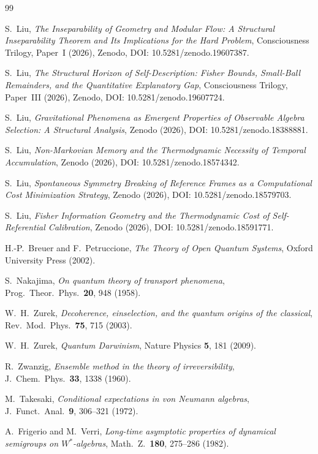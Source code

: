 \documentclass[12pt]{article}
\theoremstyle{definition}
\theoremstyle{remark}
\begin{document}
\begin{thebibliography}{99}

S.~Liu,
\emph{The Inseparability of Geometry and Modular Flow: A Structural Inseparability Theorem and Its Implications for the Hard Problem},
Consciousness Trilogy, Paper~I (2026),
Zenodo, DOI: 10.5281/zenodo.19607387.

S.~Liu,
\emph{The Structural Horizon of Self-Description: Fisher Bounds, Small-Ball Remainders, and the Quantitative Explanatory Gap},
Consciousness Trilogy, Paper~III (2026),
Zenodo, DOI: 10.5281/zenodo.19607724.

S.~Liu,
\emph{Gravitational Phenomena as Emergent Properties of Observable Algebra Selection: A Structural Analysis},
Zenodo (2026), DOI: 10.5281/zenodo.18388881.

S.~Liu,
\emph{Non-Markovian Memory and the Thermodynamic Necessity of Temporal Accumulation},
Zenodo (2026), DOI: 10.5281/zenodo.18574342.

S.~Liu,
\emph{Spontaneous Symmetry Breaking of Reference Frames as a Computational Cost Minimization Strategy},
Zenodo (2026), DOI: 10.5281/zenodo.18579703.

S.~Liu,
\emph{Fisher Information Geometry and the Thermodynamic Cost of Self-Referential Calibration},
Zenodo (2026), DOI: 10.5281/zenodo.18591771.

H.-P.~Breuer and F.~Petruccione,
\emph{The Theory of Open Quantum Systems},
Oxford University Press (2002).

S.~Nakajima,
\emph{On quantum theory of transport phenomena},
Prog.\ Theor.\ Phys.\ \textbf{20}, 948 (1958).

W.~H.~Zurek,
\emph{Decoherence, einselection, and the quantum origins of the classical},
Rev.\ Mod.\ Phys.\ \textbf{75}, 715 (2003).

W.~H.~Zurek,
\emph{Quantum Darwinism},
Nature Physics \textbf{5}, 181 (2009).

R.~Zwanzig,
\emph{Ensemble method in the theory of irreversibility},
J.\ Chem.\ Phys.\ \textbf{33}, 1338 (1960).

M.~Takesaki,
\emph{Conditional expectations in von Neumann algebras},
J.\ Funct.\ Anal.\ \textbf{9}, 306--321 (1972).

A.~Frigerio and M.~Verri,
\emph{Long-time asymptotic properties of dynamical semigroups on $W^*$-algebras},
Math.\ Z.\ \textbf{180}, 275--286 (1982).

\end{thebibliography}
\end{document}
